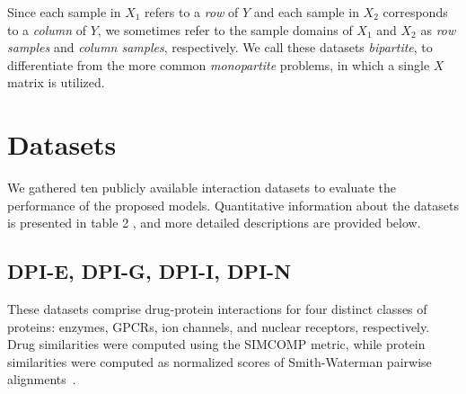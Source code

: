 Since each sample in $X_1$ refers to a \emph{row} of $Y$ and each sample in
$X_2$ corresponds to a \emph{column} of $Y$, we sometimes refer to the sample
domains of $X_1$ and $X_2$ as \emph{row samples} and \emph{column samples},
respectively. We call these datasets \emph{bipartite}, to differentiate from the
more common \emph{monopartite} problems, in which a single $X$ matrix is
utilized.





\section{Datasets}
\label{sec:datasets}

We gathered ten publicly available interaction datasets to evaluate the performance of the proposed models. Quantitative information about the datasets is presented in table 2%
, and more detailed descriptions are provided below.

\subsection{DPI-E, DPI-G, DPI-I, DPI-N}

These datasets comprise drug-protein interactions for four distinct classes of proteins: enzymes, GPCRs, ion channels, and nuclear receptors, respectively. Drug similarities were computed using the SIMCOMP metric, while protein similarities were computed as normalized scores of Smith-Waterman pairwise alignments~\cite{yamanishi2008}.

